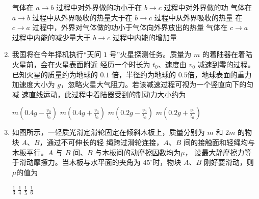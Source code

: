 \begin{enumerate}
\fourchoices
{气体在 $ a \rightarrow b $ 过程中对外界做的功小于在 $ b \rightarrow c $ 过程中对外界做的功}
{气体在 $ a \rightarrow b $ 过程中从外界吸收的热量大于在 $ b \rightarrow c $ 过程中从外界吸收的热量}
{在 $ c \rightarrow a $ 过程中，外界对气体做的功小于气体向外界放出的热量}
{气体在 $ c \rightarrow a $ 过程中内能的减少量大于 $ b \rightarrow c $ 过程中内能的增加量}





\item
我国将在今年择机执行“天问 $ 1 $ 号”火星探测任务。质量为 $ m $ 的着陆器在着陆火星前，会在火星表面附近
经历一个时长为 $ t_{0} $、速度由 $ v_{0} $ 减速到零的过程。已知火星的质量约为地球的 $ 0.1 $ 倍，半径约为地球的 $ 0.5 $倍，地球表面的重力加速度大小为 $ g $，忽略火星大气阻力。若该减速过程可视为一个竖直向下的匀减
速直线运动，此过程中着陆器受到的制动力大小约为  

\fourchoices
{$m\left(0.4 g-\frac{v_{0}}{t_{0}}\right)$}
{$ m\left(0.4 g+\frac{v_{0}}{t_{0}}\right)$}
{$ m\left(0.2 g-\frac{v_{0}}{t_{0}}\right)$}
{$ m\left(0.2 g+\frac{v_{0}}{t_{0}}\right)$}






\item
如图所示，一轻质光滑定滑轮固定在倾斜木板上，质量分别为 $ m $ 和 $ 2m $ 的物块 $ A $、$ B $，通过不可伸长的轻
绳跨过滑轮连接，$ A $、$ B $ 间的接触面和轻绳均与木板平行。$ A $ 与 $ B $ 间、$ B $ 与木板间的动摩擦因数均为$ \mu $，
设最大静摩擦力等于滑动摩擦力。当木板与水平面的夹角为 $ 45 ^{ \circ } $时，物块 $ A $、$ B $ 刚好要滑动，则$ \mu $的值为  
\begin{figure}[h!]
\centering

\end{figure}

\fourchoices
{$\frac{1}{3}$}
{$\frac{1}{4}$}
{$\frac{1}{5}$}
{$\frac{1}{6}$}









\end{enumerate}
